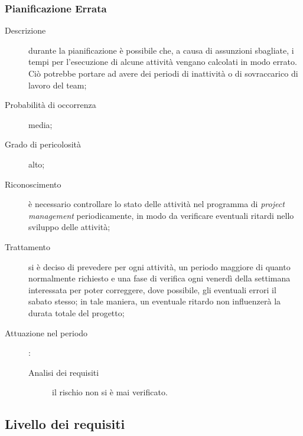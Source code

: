 		\subsubsection{Pianificazione Errata}
		\begin{description}
			\item[Descrizione] durante la pianificazione è possibile che, a causa di assunzioni sbagliate, i tempi per l'esecuzione di alcune attività vengano calcolati in modo errato. Ciò potrebbe portare ad avere dei periodi di inattività o di sovraccarico di lavoro del team;
			\item[Probabilità di occorrenza] media;
			\item[Grado di pericolosità] alto;
			\item[Riconoscimento] è necessario controllare lo stato delle attività nel programma di \emph{project management} periodicamente, in modo da verificare eventuali ritardi nello sviluppo delle attività; 
			\item[Trattamento] si è deciso di prevedere per ogni attività, un periodo maggiore di quanto normalmente richiesto e una fase di verifica ogni venerdì della settimana interessata per poter correggere, dove possibile, gli eventuali errori il sabato stesso; in tale maniera, un eventuale ritardo non influenzerà la durata totale del progetto; 
			\item[Attuazione nel periodo]:
			\begin{description}
				\item[Analisi dei requisiti]  il rischio non si è mai verificato.
			\end{description}
		\end{description}
	\subsection{Livello dei requisiti} \label{sec:req}
